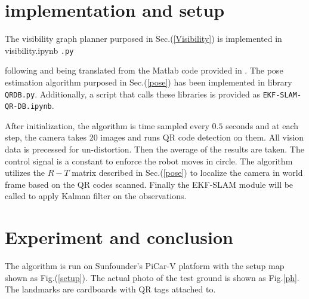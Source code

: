 \documentclass[12pt]{article}
\begin{document}
\section{implementation and setup}

The visibility graph planner purposed in Sec.(\ref{Visibility}) is implemented in visibility.ipynb \texttt{.py} 



following and being translated from the Matlab code provided in \cite{ekf}. The pose estimation algorithm purposed in Sec.(\ref{pose}) has been implemented in library \texttt{QRDB.py}.  Additionally, a script that calls these libraries is provided as \texttt{EKF-SLAM-QR-DB.ipynb}. 

After initialization, the algorithm is time sampled every $0.5$ seconds and at each step, the camera takes 20 images and runs QR code detection on them. All vision data is precessed for un-distortion. Then the average of the results are taken. The control signal is a constant to enforce the robot moves in circle. The algorithm utilizes the $R-T$ matrix described in Sec.(\ref{pose}) to localize the camera in world frame based on the QR codes scanned.  Finally the EKF-SLAM module will be called to apply Kalman filter on the observations.


\section{Experiment and conclusion}
The algorithm is run on Sunfounder's PiCar-V platform with the setup map shown as Fig.(\ref{setup}).  The actual photo of the test ground is shown as Fig.{\ref{ph}}.
The landmarks are cardboards with QR tags attached to. 
\end{document}
